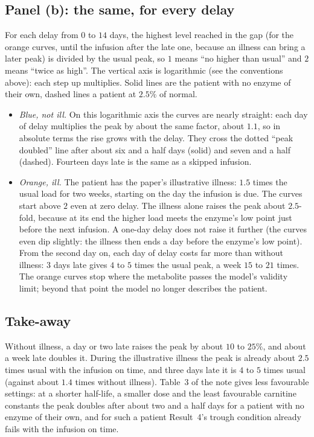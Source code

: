 \documentclass[11pt,a4paper]{article}
\begin{document}
\subsection{Panel (b): the same, for every delay} For each delay from $0$ to $14$ days, the
highest level reached in the gap (for the orange curves, until the infusion after the late one,
because an illness can bring a later peak) is divided by the usual peak, so $1$ means ``no higher than
usual'' and $2$ means ``twice as high''. The vertical axis is logarithmic (see the conventions
above): each step up multiplies. Solid lines are the patient with no enzyme of their own, dashed
lines a patient at $2.5\%$ of normal.
\begin{itemize}
\item \emph{Blue, not ill.} On this logarithmic axis the curves are nearly straight: each day of
delay multiplies the peak by about the same factor, about $1.1$, so in absolute terms the rise
grows with the delay. They cross the
dotted ``peak doubled'' line after about six and a half days (solid) and seven and a half
(dashed). Fourteen days late is the same as a skipped infusion.
\item \emph{Orange, ill.} The patient has the paper's illustrative illness: $1.5$ times the usual
load for two weeks, starting on the day the infusion is due. The curves start above $2$ even at
zero delay. The illness alone raises the peak about $2.5$-fold, because at its end the higher
load meets the enzyme's low point just before the next infusion. A one-day delay does not raise
it further (the curves even dip slightly: the illness then ends a day before the enzyme's low
point). From the second day on, each day of delay costs far more than without illness: $3$ days
late gives $4$ to $5$ times the usual peak, a week $15$ to $21$ times. The orange curves stop where the metabolite passes the model's validity
limit; beyond that point the model no longer describes the patient.
\end{itemize}

\subsection{Take-away} Without illness, a day or two late raises the peak by about $10$ to $25\%$,
and about a week late doubles it. During the illustrative illness the peak is already about $2.5$
times usual with the infusion on time, and three days late it is $4$ to $5$ times usual (against
about $1.4$ times without illness). Table~3 of the note gives less favourable settings: at a shorter
half-life, a smaller dose and the least favourable carnitine constants the peak doubles after
about two and a half days for a patient with no enzyme of their own, and for such a patient
Result~4's trough condition already fails with the infusion on time.
\end{document}
